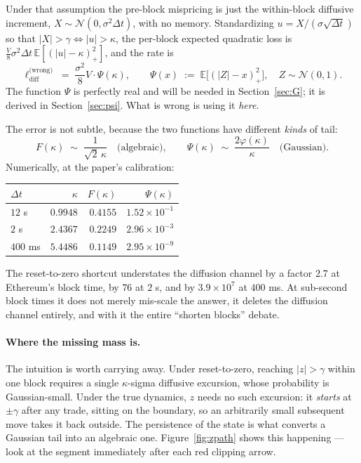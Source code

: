 \documentclass[11pt]{article}
\theoremstyle{definition}
\theoremstyle{remark}
\newcommand{\E}{\mathbb{E}}
\newcommand{\dt}{\Delta t}
\newcommand{\1}{\mathbf{1}}
\begin{document}
Under that assumption the pre-block mispricing is just the within-block diffusive increment, $X \sim \mathcal N(0, \sigma^2\dt)$, with no memory. Standardizing $u = X/(\sigma\sqrt{\dt})$ so that $|X| > \gamma \iff |u| > \kappa$, the per-block expected quadratic loss is $\tfrac{V}{8}\sigma^2\dt\,\E[(|u|-\kappa)_+^2]$, and the rate is
\[
\ell_{\mathrm{diff}}^{\text{(wrong)}} \;=\; \frac{\sigma^2}{8}V \cdot \Psi(\kappa),
\qquad
\Psi(x) \;:=\; \E\big[(|Z|-x)_+^2\big], \quad Z \sim \mathcal N(0,1).
\]
The function $\Psi$ is perfectly real and will be needed in Section~\ref{sec:G}; it is derived in Section~\ref{sec:psi}. What is wrong is using it \emph{here}.

The error is not subtle, because the two functions have different \emph{kinds} of tail:
\[
F(\kappa) \;\sim\; \frac{1}{\sqrt2\,\kappa} \quad\text{(algebraic)},
\qquad
\Psi(\kappa) \;\sim\; \frac{2\varphi(\kappa)}{\kappa} \quad\text{(Gaussian)} .
\]
Numerically, at the paper's calibration:

\begin{center}
\begin{tabular}{lrrr}
\toprule
$\dt$ & $\kappa$ & $F(\kappa)$ & $\Psi(\kappa)$ \\
\midrule
$12$ s   & $0.9948$  & $0.4155$ & $1.52\times10^{-1}$ \\
$2$ s    & $2.4367$  & $0.2249$ & $2.96\times10^{-3}$ \\
$400$ ms & $5.4486$  & $0.1149$ & $2.95\times10^{-9}$ \\
\bottomrule
\end{tabular}
\end{center}

\noindent The reset-to-zero shortcut understates the diffusion channel by a factor $2.7$ at Ethereum's block time, by $76$ at $2$ s, and by $3.9\times10^{7}$ at $400$ ms. At sub-second block times it does not merely mis-scale the answer, it deletes the diffusion channel entirely, and with it the entire ``shorten blocks'' debate.

\paragraph{Where the missing mass is.} The intuition is worth carrying away. Under reset-to-zero, reaching $|z| > \gamma$ within one block requires a single $\kappa$-sigma diffusive excursion, whose probability is Gaussian-small. Under the true dynamics, $z$ needs no such excursion: it \emph{starts} at $\pm\gamma$ after any trade, sitting on the boundary, so an arbitrarily small subsequent move takes it back outside. The persistence of the state is what converts a Gaussian tail into an algebraic one. Figure~\ref{fig:zpath} shows this happening --- look at the segment immediately after each red clipping arrow.
\end{document}
